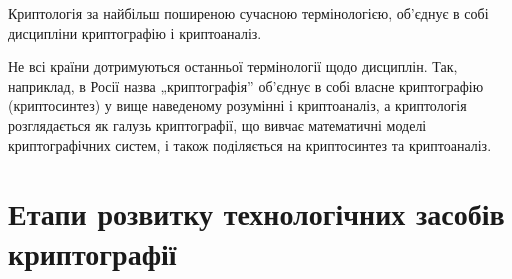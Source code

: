 \begin{definition}[Криптологія]
    Криптологія за найбільш поширеною сучасною
    термінологією, об'єднує в собі дисципліни криптографію і
    криптоаналіз.
\end{definition}

\begin{remark}
    Не всі  країни дотримуються останньої термінології щодо
    дисциплін. Так, наприклад, в Росії назва „криптографія” об’єднує в собі власне
    криптографію (криптосинтез) у вище наведеному розумінні і криптоаналіз, а
    криптологія розглядається як галузь криптографії, що вивчає математичні моделі
    криптографічних систем, і також поділяється на криптосинтез та криптоаналіз.
\end{remark}
\section{Етапи розвитку технологічних засобів  криптографії}
